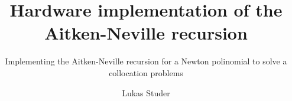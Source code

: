 \documentclass[
  a4paper,
  BCOR=15mm,            %
  twoside,
  bibliography=totoc,   %
  listof=totoc,         %
  monolingual,
  invert-title,
]{bfhpub}
\theoremstyle{definition}
\begin{document}
\raggedbottom

\frontmatter

\title{Hardware implementation of the Aitken-Neville recursion}
\subtitle{Implementing the Aitken-Neville recursion for a Newton polinomial to solve a collocation problems}
\author{Lukas Studer}


\maketitle

\clearpage

\tableofcontents

\mainmatter








\listoffigures

\listoftables

\lstlistoflistings

\clearpage
\printindex
\end{document}
